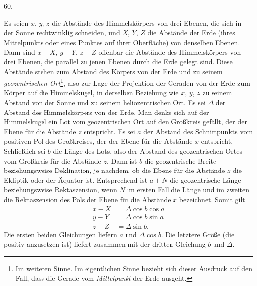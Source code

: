 \par\medskip
\hypertarget{native-079-article060}{}
\begin{center}60.\end{center}
Es seien $x$, $y$, $z$ die Abstände des Himmelskörpers von drei Ebenen, die sich in der Sonne rechtwinklig schneiden, und $X$, $Y$, $Z$ die Abstände der Erde (ihres Mittelpunkts oder eines Punktes auf ihrer Oberfläche) von denselben Ebenen. Dann sind $x-X$, $y-Y$, $z-Z$ offenbar die Abstände des Himmelskörpers von drei Ebenen, die parallel zu jenen Ebenen durch die Erde gelegt sind. Diese Abstände stehen zum Abstand des Körpers von der Erde und zu seinem \textit{geozentrischen Ort}\footnote{Im weiteren Sinne. Im eigentlichen Sinne bezieht sich dieser Ausdruck auf den Fall, dass die Gerade vom \textit{Mittelpunkt} der Erde ausgeht.}, also zur Lage der Projektion der Geraden von der Erde zum Körper auf die Himmelskugel, in derselben Beziehung wie $x$, $y$, $z$ zu seinem Abstand von der Sonne und zu seinem heliozentrischen Ort. Es sei $\Delta$ der Abstand des Himmelskörpers von der Erde. Man denke sich auf der Himmelskugel ein Lot vom geozentrischen Ort auf den Großkreis gefällt, der der Ebene für die Abstände $z$ entspricht. Es sei $a$ der Abstand des Schnittpunkts vom positiven Pol des Großkreises, der der Ebene für die Abstände $x$ entspricht. Schließlich sei $b$ die Länge des Lots, also der Abstand des geozentrischen Ortes vom Großkreis für die Abstände $z$. Dann ist $b$ die geozentrische Breite beziehungsweise Deklination, je nachdem, ob die Ebene für die Abstände $z$ die Ekliptik oder der Äquator ist. Entsprechend ist $a+N$ die geozentrische Länge beziehungsweise Rektaszension, wenn $N$ im ersten Fall die Länge und im zweiten die Rektaszension des Pols der Ebene für die Abstände $x$ bezeichnet. Somit gilt
\[
\begin{aligned}
x-X&=\Delta\cos b\cos a\\
y-Y&=\Delta\cos b\sin a\\
z-Z&=\Delta\sin b.
\end{aligned}
\]
Die ersten beiden Gleichungen liefern $a$ und $\Delta\cos b$. Die letztere Größe (die positiv anzusetzen ist) liefert zusammen mit der dritten Gleichung $b$ und $\Delta$.
